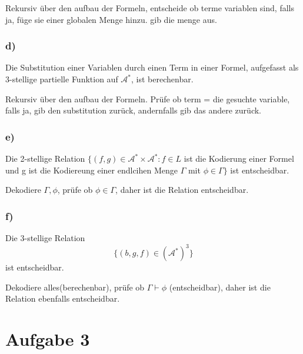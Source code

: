 \documentclass[12pt]{article}
\begin{document}
Rekursiv über den aufbau der Formeln, entscheide ob terme variablen sind, falls ja, füge sie einer globalen Menge hinzu. gib die menge aus.

\subsubsection*{d)}
Die Substitution einer Variablen durch einen Term in einer Formel, aufgefasst
als 3-stellige partielle Funktion auf $\mathcal{A}^*$, ist berechenbar.

Rekursiv über den aufbau der Formeln. Prüfe ob term = die gesuchte variable, falls ja,
gib den substitution zurück, andernfalls gib das andere zurück.

\subsubsection*{e)}
Die 2-stellige Relation 
$\{(f,g)\in \mathcal{A}^*\times \mathcal{A}^*:f\in L$ ist die Kodierung einer Formel und g ist die Kodiereung einer endlcihen Menge $\Gamma$ mit $\phi\in\Gamma \} $
ist entscheidbar.

Dekodiere $\Gamma,\phi$, prüfe ob $\phi\in\Gamma$, daher ist die Relation entscheidbar.

\subsubsection*{f)}
Die 3-stellige Relation
\[ \{(b,g,f)\in (\mathcal{A}^*)^3\} \]
ist entscheidbar.

Dekodiere alles(berechenbar), prüfe ob $\Gamma\vdash\phi$ (entscheidbar), daher ist die Relation ebenfalls entscheidbar.
\section*{Aufgabe 3}
\end{document}
